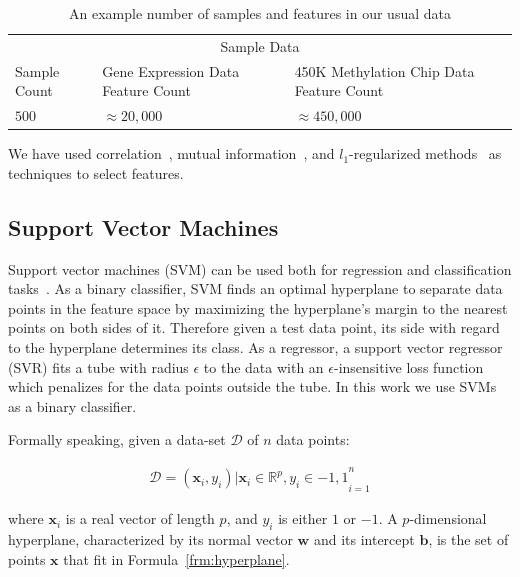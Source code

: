 \begin{table}[th!]
  \centering
  \begin{tabular}{p{} p{} p{}}
    \hline
    \multicolumn{3}{c}{Sample Data} \\
    \cline{1-3}
    Sample Count   & Gene Expression Data Feature Count & 450K Methylation Chip Data Feature Count \\
    \hline
    $500$      & $\approx 20,000$    & $\approx 450,000$   \\
    \hline
  \end{tabular}
  \caption{An example number of samples and features in our usual data}
  \label{tab:sample-sample-size}
\end{table}

We have used correlation~\cite{correlation}, mutual information~\cite{mutual-information}, and $l_1$-regularized methods~\cite{l1-regularized} as techniques to select features.

\subsection{Support Vector Machines}
\label{sec:svms}

Support vector machines (SVM) can be used both for regression and
classification tasks~\cite{svm2, svr1}. As a binary classifier, SVM finds an
optimal hyperplane to separate data points in the feature space by maximizing
the hyperplane's margin to the nearest points on both sides of it. Therefore
given a test data point, its side with regard to the hyperplane determines its
class. As a regressor, a support vector regressor (SVR) fits a tube with radius
$\epsilon$ to the data with an $\epsilon$-insensitive loss
function~\cite{thenatureofstatisticallearningtheory} which penalizes for the
data points outside the tube. In this work we use SVMs as a binary classifier.

Formally speaking, given a data-set $\mathcal{D}$ of $n$ data points:

\begin{align}
  \mathcal{D}={(\mathbf{x}_i, y_i) | \mathbf{x}_i \in \mathbb{R}^p, y_i \in {-1, 1}}_{i=1}^{n}
\end{align}

where $\mathbf{x}_i$ is a real vector of length $p$, and $y_i$ is either $1$ or $-1$. A $p$-dimensional hyperplane, characterized by its normal vector $\mathbf{w}$ and its intercept $\mathbf{b}$, is the set of points $\mathbf{x}$ that fit in Formula~\ref{frm:hyperplane}.

